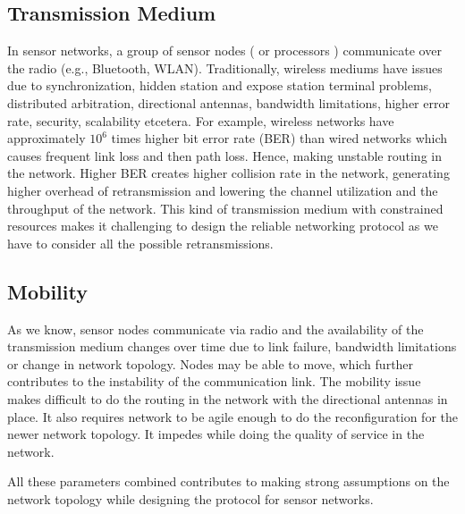 	\subsection{Transmission Medium}
		In sensor networks, a group of sensor nodes ( or processors ) communicate over the radio (e.g., Bluetooth, WLAN).
		Traditionally, wireless mediums have issues due to synchronization, hidden station and expose station terminal problems, distributed arbitration, directional antennas, bandwidth limitations, higher error rate, security, scalability etcetera.
		For example, wireless networks have approximately $10^6$ times higher bit error rate (BER) than wired networks which causes frequent link loss and then path loss. 
		Hence, making unstable routing in the network.
		Higher BER creates higher collision rate in the network, generating higher overhead of retransmission and lowering the channel utilization and the throughput of the network.
		This kind of transmission medium with constrained resources makes it challenging to design the reliable networking protocol as we have to consider all the possible retransmissions.

	\subsection{Mobility}
		As we know, sensor nodes communicate via radio and the availability of the transmission medium changes over time due to link failure, bandwidth limitations or change in network topology.
		Nodes may be able to move, which further contributes to the instability of the communication link.
		The mobility issue makes difficult to do the routing in the network with the directional antennas in place.
		It also requires network to be agile enough to do the reconfiguration for the newer network topology.
		It impedes while doing the quality of service in the network. 
		
	All these parameters combined contributes to making strong assumptions on the network topology while designing the protocol for sensor networks.